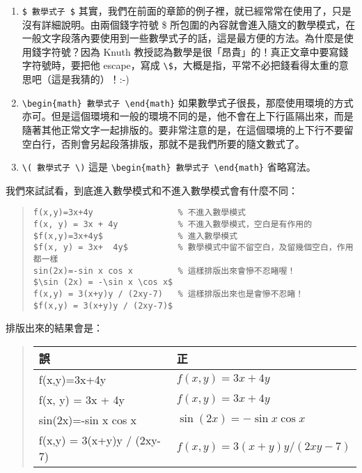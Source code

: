 \begin{enumerate}

  \item \verb|$ 數學式子 $| \newline
        其實，我們在前面的章節的例子裡，就已經常常在使用了，只是沒有詳細說明。由兩個錢字符號 {\ttfamily \$} 所包圍的內容就會進入隨文的數學模式，在一般文字段落內要使用到一些數學式子的話，這是最方便的方法。為什麼是使用錢字符號？因為 Knuth 教授認為數學是很「昂貴」的！真正文章中要寫錢字符號時，要把他 escape，寫成 \verb|\$|，大概是指，平常不必把錢看得太重的意思吧（這是我猜的）！:-)

  \item \verb|\begin{math} 數學式子 \end{math}| \newline
        如果數學式子很長，那麼使用環境的方式亦可。但是這個環境和一般的環境不同的是，他不會在上下行區隔出來，而是隨著其他正常文字一起排版的。要非常注意的是，在這個環境的上下行不要留空白行，否則會另起段落排版，那就不是我們所要的隨文數式了。

  \item \verb|\( 數學式子 \)| \newline
        這是 \verb|\begin{math} 數學式子 \end{math}| 省略寫法。

\end{enumerate}

我們來試試看，到底進入數學模式和不進入數學模式會有什麼不同：

\begin{quote}
  \begin{verbatim}
f(x,y)=3x+4y                 % 不進入數學模式
f(x, y) = 3x + 4y            % 不進入數學模式，空白是有作用的
$f(x,y)=3x+4y$               % 進入數學模式
$f(x, y) = 3x+  4y$          % 數學模式中留不留空白，及留幾個空白，作用都一樣
sin(2x)=-sin x cos x         % 這樣排版出來會慘不忍睹喔！
$\sin (2x) = -\sin x \cos x$
f(x,y) = 3(x+y)y / (2xy-7)   % 這樣排版出來也是會慘不忍睹！
$f(x,y) = 3(x+y)y / (2xy-7)$
\end{verbatim}
\end{quote}

排版出來的結果會是：

\begin{quote}
  \begin{tabular}{ll}
    誤                         & 正                           \\
    \hline
    f(x,y)=3x+4y               & $f(x,y)=3x+4y$               \\
    f(x, y) = 3x + 4y          & $f(x, y) = 3x  +  4y$        \\
    sin(2x)=-sin x cos x       & $\sin (2x) = -\sin x \cos x$ \\
    f(x,y) = 3(x+y)y / (2xy-7) & $f(x,y) = 3(x+y)y / (2xy-7)$
  \end{tabular}
\end{quote}

